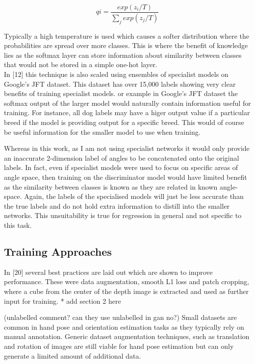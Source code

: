 \documentclass{article}
\begin{document}
\[qi = \frac{exp(z_i/T)}{\sum_j exp(z_j/T)}\]

Typically a high temperature is used which causes a softer distribution where the probabilities are spread over more classes. This is where the benefit of knowledge lies as the softmax layer can store information about similarity between classes that would not be stored in a simple one-hot layer.\\

In [12] this technique is also scaled using ensembles of specialist models on Google's JFT dataset. This dataset has over 15,000 labels showing very clear benefits of training specialist models. or example in Google's JFT dataset the softmax output of the larger model would naturally contain information useful for training. For instance, all dog labels may have a higer output value if a particular breed if the model is providing output for a specific breed. This would of course be useful information for the smaller model to use when training.

Whereas in this work, as I am not using specialist networks it would only provide an inaccurate 2-dimension label of angles to be concatenated onto the original labels. In fact, even if specialist models were used to focus on specific areas of angle space, then training on the discriminator model would have limited benefit as the similarity between classes is known as they are related in known angle-space.  Again, the labels of the specialised models will just be less accurate than the true labels and do not hold extra information to distill into the smaller networks. This unsuitability is true for regression in general and not specific to this task. \\

\subsection{Training Approaches}
In [20] several best practices are laid out which are shown to improve performance. These were data augmentation, smooth L1 loss and patch cropping, where a cube from the center of the depth image is extracted and used as further input for training. * add section 2 here

(unlabelled comment? can they use unlabelled in gan no?)
Small datasets are common in hand pose and orientation estimation tasks as they typically rely on manual annotation.   Generic dataset augmentation techniques, such as translation and rotation of images are still viable for hand pose estimation but can only generate a limited amount of additional data. 
\end{document}
